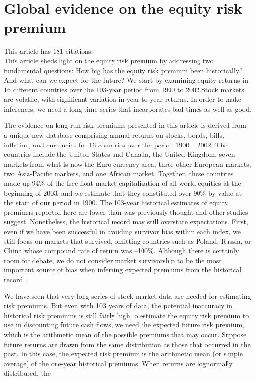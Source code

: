 \documentclass[12 pt]{article}
\begin{document}
\section{Global evidence on the equity risk premium}
This article has 181 citations. \\
This article sheds light on the equity risk premium by addressing two fundamental questions:
How big has the equity risk premium been historically? And what can we expect for the future? We start by examining equity returns in 16 different countries over the 103-year period from 1900 to 2002.Stock markets are volatile, with significant variation in year-to-year returns. In order to make inferences, we need a long time series that incorporates bad times as well as good. 
\par The evidence on long-run risk premiums presented in this article is derived from a unique new database comprising annual returns on stocks, bonds, bills, inflation, and currencies for 16 countries over the period 1900 – 2002. The countries include the United States and Canada, the United Kingdom, seven markets from what is now the Euro currency area, three other European markets, two Asia-Pacific markets, and one African market. Together, these countries made up 94\% of the free float market capitalization of all world equities at the beginning of 2003, and we estimate that they constituted over 90\% by value at the start of our period in 1900. The 103-year historical estimates of equity premiums reported here are lower than was previously thought and other studies suggest. Nonetheless, the historical record may still overstate expectations. First, even if we have been successful in avoiding survivor bias within each index, we still focus on markets that survived, omitting countries such as Poland, Russia, or China whose compound rate of return was –100\%. Although there is certainly room for debate, we do not consider market survivorship to be the most important source of bias when inferring expected premiums from the historical record.
\par We have seen that very long series of stock market data are needed for estimating risk premiums. But even with 103 years of data, the potential inaccuracy in historical risk premiums is still fairly high. o estimate the equity risk premium to use in
discounting future cash flows, we need the expected future risk premium, which is the arithmetic mean of the possible premiums that may occur. Suppose future returns are drawn from the same distribution as those that occurred in the past. In this case, the expected risk premium is the arithmetic mean (or simple average) of the one-year historical premiums. When returns are lognormally distributed, the
\end{document}
